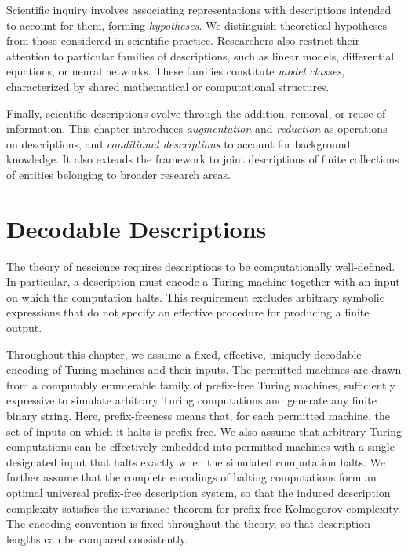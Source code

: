 Scientific inquiry involves associating representations with descriptions intended to account for them, forming \emph{hypotheses}. We distinguish theoretical hypotheses from those considered in scientific practice. Researchers also restrict their attention to particular families of descriptions, such as linear models, differential equations, or neural networks. These families constitute \emph{model classes}, characterized by shared mathematical or computational structures.

Finally, scientific descriptions evolve through the addition, removal, or reuse of information. This chapter introduces \emph{augmentation} and \emph{reduction} as operations on descriptions, and \emph{conditional descriptions} to account for background knowledge. It also extends the framework to joint descriptions of finite collections of entities belonging to broader research areas.

%
%

\section{Decodable Descriptions}
\label{sec:decodable_descriptions}

The theory of nescience requires descriptions to be computationally well-defined. In particular, a description must encode a Turing machine together with an input on which the computation halts. This requirement excludes arbitrary symbolic expressions that do not specify an effective procedure for producing a finite output.

Throughout this chapter, we assume a fixed, effective, uniquely decodable encoding of Turing machines and their inputs. The permitted machines are drawn from a computably enumerable family of prefix-free Turing machines, sufficiently expressive to simulate arbitrary Turing computations and generate any finite binary string. Here, prefix-freeness means that, for each permitted machine, the set of inputs on which it halts is prefix-free. We also assume that arbitrary Turing computations can be effectively embedded into permitted machines with a single designated input that halts exactly when the simulated computation halts. We further assume that the complete encodings of halting computations form an optimal universal prefix-free description system, so that the induced description complexity satisfies the invariance theorem for prefix-free Kolmogorov complexity. The encoding convention is fixed throughout the theory, so that description lengths can be compared consistently.

